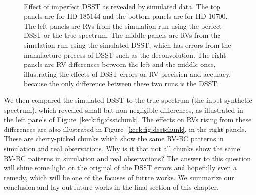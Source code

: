 \begin{figure}
\
\
\caption{Effect of imperfect DSST as revealed by simulated data. The top
  panels are for HD 185144 and the bottom panels are for HD 10700. The
  left panels are RVs from the simulation run using the perfect DSST
  or the true spectrum. The middle panels are RVs from the simulation
  run using the simulated DSST, which has errors from the manufacture
  process of DSST such as the deconvolution. The right panels are RV
  differences between the left and the middle ones, illustrating the
  effects of DSST errors on RV precision and accuracy, because the
  only difference between these two runs is the DSST.
\label{keck:fig:dsst}}
\end{figure}


We then compared the simulated DSST to the true spectrum (the input
synthetic spectrum), which revealed small but non-negligible
differences, as illustrated in the left panels of
Figure~\ref{keck:fig:dsstchunk}. The effects on RVs rising from these
differences are also illustrated in Figure~\ref{keck:fig:dsstchunk},
in the right panels. These are cherry-picked chunks which show the
same RV-BC patterns in simulation and real observations. Why is it
that not all chunks show the same RV-BC patterns in simulation and real
observations? The answer to this question will shine some light on the
original of the DSST errors and hopefully even a remedy, which will be
one of the focuses of future works. We summarize our conclusion and
lay out future works in the final section of this chapter.


